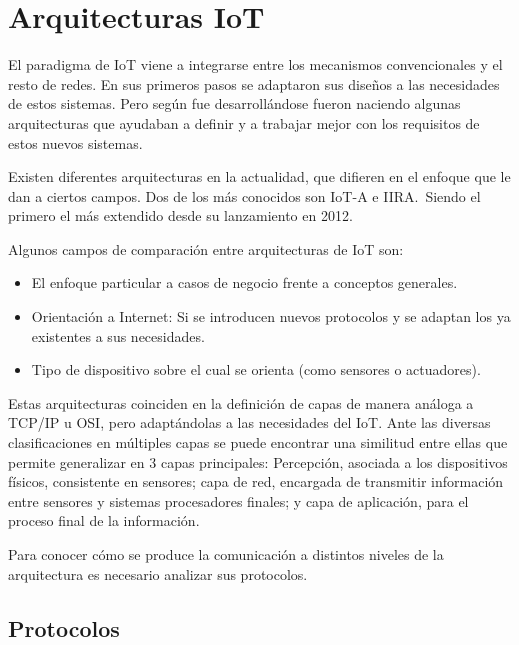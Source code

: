 \documentclass[a4paper,10pt]{article}
\begin{document}
\newpage

\section{Arquitecturas IoT}\label{arquitecturas-iot}

El paradigma de IoT viene a integrarse entre los mecanismos
convencionales y el resto de redes. En sus primeros pasos se adaptaron
sus diseños a las necesidades de estos sistemas. Pero según fue
desarrollándose fueron naciendo algunas arquitecturas que ayudaban a
definir y a trabajar mejor con los requisitos de estos nuevos sistemas.

Existen diferentes arquitecturas en la actualidad, que difieren en el
enfoque que le dan a ciertos campos. Dos de los más conocidos son IoT-A
e IIRA.\ Siendo el primero el más extendido desde su lanzamiento en
2012.\cite{weyrichReferenceArchitecturesInternet2016}

Algunos campos de comparación entre arquitecturas de IoT son\cite{atzoriInternetThingsSurvey2010}:

\begin{itemize}
\item
  El enfoque particular a casos de negocio frente a conceptos generales.
\item
  Orientación a Internet: Si se introducen nuevos protocolos y se
  adaptan los ya existentes a sus necesidades.
\item
  Tipo de dispositivo sobre el cual se orienta (como sensores o
  actuadores).
\end{itemize}

Estas arquitecturas coinciden en la definición de capas de manera
análoga a TCP/IP u
OSI\cite{weyrichReferenceArchitecturesInternet2016}, pero adaptándolas
a las necesidades del IoT. Ante las diversas clasificaciones en
múltiples capas se puede encontrar una similitud entre ellas que
permite generalizar en 3 capas principales: Percepción, asociada a los
dispositivos físicos, consistente en sensores; capa de red, encargada
de transmitir información entre sensores y sistemas procesadores
finales; y capa de aplicación, para el proceso final de la
información\cite{khanFutureInternetInternet2012}.

Para conocer cómo se produce la comunicación a distintos niveles de la
arquitectura es necesario analizar sus protocolos.

\subsection{Protocolos}\label{subsec:protocolos}
\end{document}
